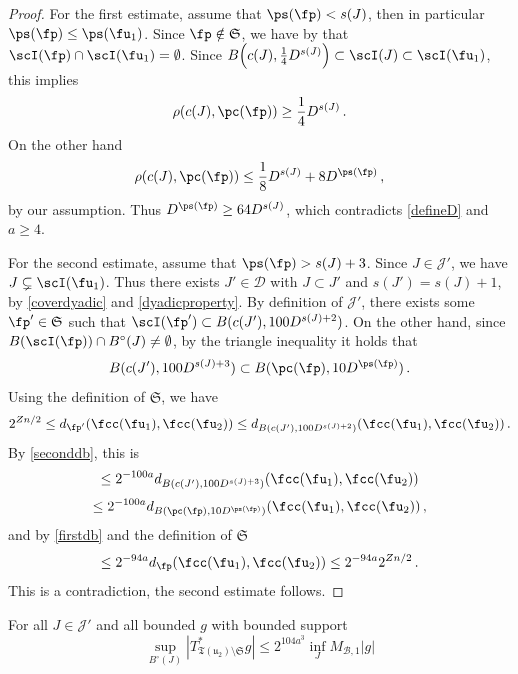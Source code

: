     \begin{proof}
        For the first estimate, assume that $\ps(\fp) < s(J)$, then in particular $\ps(\fp) \le \ps(\fu_1)$. Since $\fp \notin \mathfrak{S}$, we have by  that $\scI(\fp) \cap \scI(\fu_1) = \emptyset$.
        Since $B\Big(c(J), \frac{1}{4} D^{s(J)}\Big) \subset \scI(J) \subset \scI(\fu_1)$, this implies
        $$
            \rho(c(J), \pc(\fp)) \ge \frac{1}{4}D^{s(J)}\,.
        $$
        On the other hand
        $$
            \rho(c(J), \pc(\fp)) \le \frac{1}{8} D^{s(J)} + 8 D^{\ps(\fp)}\,,
        $$
        by our assumption. Thus $D^{\ps(\fp)} \ge 64 D^{s(J)}$, which contradicts \eqref{defineD} and $a \ge 4$.

        For the second estimate, assume that $\ps(\fp) > s(J) + 3$. Since $J \in \mathcal{J}'$, we have $J \subsetneq \scI(\fu_1)$. Thus there exists $J' \in \mathcal{D}$ with $J \subset J'$ and $s(J') = s(J) + 1$, by \eqref{coverdyadic} and \eqref{dyadicproperty}. By definition of $\mathcal{J}'$, there exists some $\fp' \in \mathfrak{S}$ such that $\scI(\fp') \subset B(c(J'), 100 D^{s(J) + 2})$. On the other hand, since $B(\scI(\fp)) \cap B^\circ(J) \ne \emptyset$, by the triangle inequality it holds that
        $$
            B(c(J'), 100 D^{s(J) + 3}) \subset B(\pc(\fp), 10 D^{\ps(\fp)})\,.
        $$
        Using the definition of $\mathfrak{S}$, we have
        $$
            2^{Zn/2} \le d_{\fp'}(\fcc(\fu_1), \fcc(\fu_2)) \le d_{B(c(J'), 100 D^{s(J) + 2})}(\fcc(\fu_1), \fcc(\fu_2))\,.
        $$
        By \eqref{seconddb}, this is
        $$
            \le 2^{-100a} d_{B(c(J'), 100 D^{s(J) + 3})}(\fcc(\fu_1), \fcc(\fu_2))
        $$
        $$
            \le 2^{-100a} d_{B(\pc(\fp), 10 D^{\ps(\fp)})}(\fcc(\fu_1), \fcc(\fu_2))\,,
        $$
        and by \eqref{firstdb} and the definition of $\mathfrak{S}$
        $$
            \le 2^{-94a} d_{\fp}(\fcc(\fu_1), \fcc(\fu_2)) \le 2^{-94a} 2^{Zn/2}\,.
        $$
        This is a contradiction, the second estimate follows.
    \end{proof}


    \begin{lemma}
        \label{local-tree-control}
        \leanok
        For all $J \in \mathcal{J}'$ and all bounded $g$ with bounded support
        $$
            \sup_{B^\circ{}(J)} |T_{\mathfrak{T}(\mathfrak{u}_2)\setminus\mathfrak{S}}^* g| \le 2^{104a^3} \inf_J M_{\mathcal{B},1}|g|
        $$
    \end{lemma}

